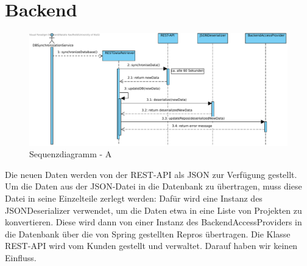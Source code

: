 


\section{Backend}

\begin{figure}[h]
	\centering
	\includegraphics[width=16cm]{img/diagrams/RESThandling.pdf}	
	\caption{Sequenzdiagramm - A}
	\label{fig:sequenz-a}
\end{figure}

\noindent
Die neuen Daten werden von der REST-API als JSON zur Verfügung gestellt. Um die Daten aus der JSON-Datei in die Datenbank zu übertragen, muss  diese Datei in seine Einzelteile zerlegt werden: Dafür wird eine Instanz des JSONDeserializer verwendet, um die Daten etwa in eine Liste von Projekten zu konvertieren. Diese wird dann von einer Instanz des BackendAccessProviders in die Datenbank über die von Spring gestellten Repros übertragen.
Die Klasse REST-API wird vom Kunden gestellt und verwaltet. Darauf haben wir keinen Einfluss.

